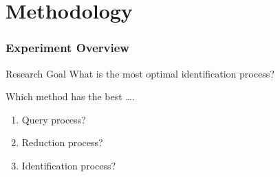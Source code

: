 \documentclass[11pt]{beamer}
\begin{document}
    \section{Methodology}\label{sec:methodology}
    \begin{frame}
        \frametitle{Experiment Overview}
        \begin{block}{Research Goal}
            What is the most optimal identification process?
        \end{block} \bigskip \bigskip
        Which method has the best \ldots.
        \begin{enumerate}
            \item Query process? \medskip
            \item Reduction process? \medskip
            \item Identification process? \medskip
        \end{enumerate}
    \end{frame}
\end{document}
